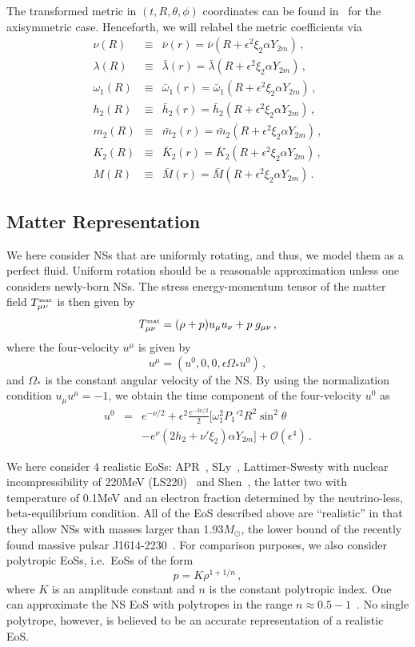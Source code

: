 \documentclass[aps,twocolumn,nofootinbib,showpacs,superscriptaddress,hyperref]{revtex4-1}
\newcommand\be{\begin{equation}}
\newcommand\ba{\begin{eqnarray}}
\newcommand\ee{\end{equation}}
\newcommand\ea{\end{eqnarray}}
\newcommand{\nn}{\nonumber}
\newcommand{\MAT}{{\mbox{\tiny mat}}}
\newcommand{\NS}{*}
\begin{document}
The transformed metric in $(t,R,\theta,\phi)$ coordinates can be found in~\cite{kent-CSNS} for the axisymmetric case.  Henceforth, we will relabel the metric coefficients via
%
\allowdisplaybreaks
\ba
\nu(R) &\equiv& \bar{\nu}(r)  = \bar{\nu}(R + \epsilon^{2} \xi_{2} \alpha Y_{2m})\,, 
\nn \\ 
\lambda(R) &\equiv& \bar{\lambda}(r)  = \bar{\lambda}(R + \epsilon^{2} \xi_{2} \alpha Y_{2m})\,, 
\nn \\ 
\omega_{1}(R) &\equiv& \bar{\omega}_{1}(r)  = \bar{\omega}_{1}(R + \epsilon^{2} \xi_{2} \alpha Y_{2m})\,, 
\nn \\ 
h_{2}(R) &\equiv& \bar{h}_{2}(r)  = \bar{h}_{2}(R + \epsilon^{2} \xi_{2} \alpha Y_{2m})\,, 
\nn \\ 
m_{2}(R) &\equiv& \bar{m}_{2}(r)  = \bar{m}_{2}(R + \epsilon^{2} \xi_{2} \alpha Y_{2m})\,, 
\nn \\ 
K_{2}(R) &\equiv& \bar{K}_{2}(r)  = \bar{K}_{2}(R + \epsilon^{2} \xi_{2} \alpha Y_{2m})\,, 
\nn \\ 
M(R) &\equiv& \bar{M}(r)  = \bar{M}(R + \epsilon^{2} \xi_{2} \alpha Y_{2m})\,.
\ea
%

\subsection{Matter Representation}

We here consider NSs that are uniformly rotating, and thus, we model them as a perfect fluid. Uniform rotation should be a reasonable approximation unless one considers newly-born NSs. The stress energy-momentum tensor of the matter field $T_{\mu\nu}^\MAT$ is then given by
%
\be
T_{\mu\nu}^\MAT = (\rho + p ) u_\mu u_\nu + p \; g_{\mu\nu}\,,
\ee
% 
where the four-velocity $u^\mu$ is given by
%
\be
u^\mu = (u^0, 0,0, \epsilon \Omega_\NS u^0)\,,
\ee
%
and $\Omega_\NS$ is the constant angular velocity of the NS. By using the normalization condition $u_\mu u^\mu = -1$, we obtain the time component of the four-velocity $u^0$ as
%
\ba
u^0 &=& e^{-\nu/2} +  \epsilon^2\frac{e^{-3\nu/2}}{2} [ \omega_1^2 P_1'{}^2 R^2 \sin^2\theta \nn \\
& & -  e^{\nu} (2 h_2 +\nu' \xi_2) \alpha Y_{2m} ] + \mathcal{O}(\epsilon^4)\,.
\ea
%

We here consider 4 realistic EoSs: APR~\cite{APR}, SLy~\cite{SLy,shibata-fitting}, Lattimer-Swesty with nuclear incompressibility of 220MeV (LS220)~\cite{LS, ott-EOS} and Shen~\cite{Shen1,Shen2,ott-EOS}, the latter two with temperature of 0.1MeV and an electron fraction determined by the neutrino-less, beta-equilibrium condition. All of the EoS described above are ``realistic'' in that they allow NSs with masses larger than 1.93$M_\odot$, the lower bound of the recently found massive pulsar J1614-2230~\cite{1.97NS}. For comparison purposes, we also consider polytropic EoSs, i.e.~EoSs of the form
%
\be
p=K \rho^{1+1/n}\,,
\label{polytropic}
\ee
%
where $K$ is an amplitude constant and $n$ is the constant polytropic index. One can approximate the NS EoS with polytropes in the range $n \approx 0.5-1$~\cite{flanagan-hinderer-love,lattimer-prakash-2001}. No single polytrope, however, is believed to be an accurate representation of a realistic EoS. 
\end{document}
